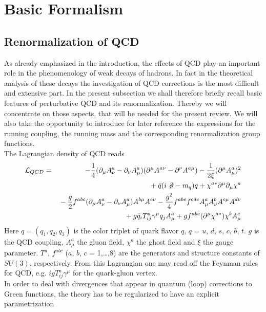 \section{Basic Formalism}
         \label{sec:basicform}
\subsection{Renormalization of QCD}
            \label{sec:basicform:renorm}
As already emphasized in the introduction, the effects of QCD play an
important role in the phenomenology of weak decays of hadrons. In fact
in the theoretical analysis of these decays the investigation of
QCD corrections is the most difficult and extensive part. In the
present subsection we shall therefore briefly recall basic features
of perturbative QCD and its renormalization. Thereby we will concentrate
on those aspects, that will be needed for the present review. We
will also take the opportunity to introduce for later reference the
expressions for the running coupling, the running mass and the
corresponding renormalization group functions.\\
The Lagrangian density of QCD reads
\begin{eqnarray}\label{lqcd}
{\cal L}_{QCD} & = &
-{1\over 4}(\partial_\mu A^a_\nu-\partial_\nu A^a_\mu)
(\partial^\mu A^{a\nu}-\partial^\nu A^{a\mu})-{1\over{2\xi}}
(\partial^\mu A^a_\mu)^2   \nonumber \\
&&{}+ \bar q(i\not\!\partial-m_q)q+\chi^{a\ast}\partial^\mu
        \partial_\mu \chi^a  \nonumber \\
&&{}-{g\over 2}f^{abc}(\partial_\mu A^a_\nu-\partial_\nu A^a_\mu)
 A^{b\mu}A^{c\nu} - {g^2\over 4}f^{abe}f^{cde}A^a_\mu A^b_\nu
 A^{c\mu}A^{d\nu} \nonumber \\
&&{}+ g \bar q_i T^a_{ij}\gamma^\mu q_j A^a_\mu +
 g f^{abc} (\partial^\mu\chi^{a\ast})\chi^b A^c_\mu
\end{eqnarray}
Here $q=(q_1, q_2, q_3)$ is the color triplet of quark flavor $q$,
$q$ = $u$, $d$, $s$, $c$, $b$, $t$. $g$ is the QCD coupling, $A^a_\mu$
the gluon field, $\chi^a$ the ghost field and $\xi$ the gauge
parameter. $T^a$, $f^{abc}$ ($a$, $b$, $c$ = 1,\ldots,8) are the
generators and structure constants of $SU(3)$, respectively. From
this Lagrangian one may read off the Feynman rules for QCD, e.g.
$i g T^a_{ij}\gamma^\mu$ for the quark-gluon vertex.\\
In order to deal with divergences that appear in quantum (loop)
corrections to Green functions, the theory has to be regularized
to have an explicit parametrization

